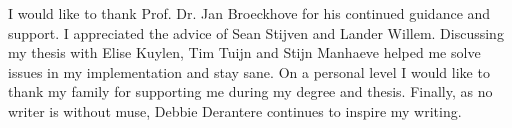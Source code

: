 I would like to thank Prof. Dr. Jan Broeckhove for his continued guidance and support. 
I appreciated the advice of Sean Stijven and Lander Willem.
Discussing my thesis with Elise Kuylen, Tim Tuijn and Stijn Manhaeve helped me solve issues in my implementation and stay sane. On a personal level I would like to thank my family for supporting me during my degree and thesis. 
Finally, as no writer is without muse, Debbie Derantere continues to inspire my writing. 